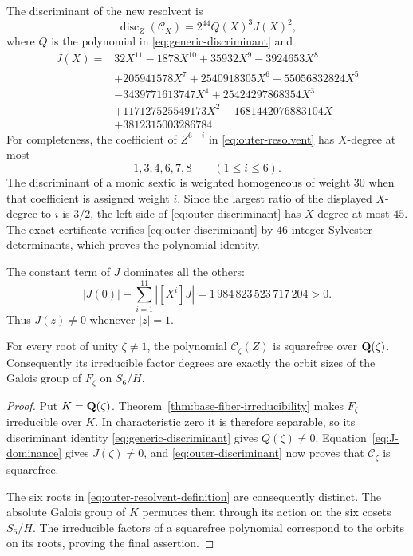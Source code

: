 The discriminant of the new resolvent is
\begin{equation}
 \operatorname{disc}_Z(\mathcal C_X)
 =2^{44}Q(X)^3J(X)^2,
 \label{eq:outer-discriminant}
\end{equation}
where $Q$ is the polynomial in \eqref{eq:generic-discriminant} and
\begin{align*}
 J(X)={}&32X^{11}-1878X^{10}+35932X^9-3924653X^8\\
 &+205941578X^7+2540918305X^6+55056832824X^5\\
 &-3439771613747X^4+25424297868354X^3\\
 &+117127525549173X^2-1681442076883104X\\
 &+3812315003286784.
\end{align*}
For completeness, the coefficient of $Z^{6-i}$ in
\eqref{eq:outer-resolvent} has $X$-degree at most
\[
 1,3,4,6,7,8\qquad(1\leq i\leq6).
\]
The discriminant of a monic sextic is weighted homogeneous of weight
$30$ when that coefficient is assigned weight $i$.  Since the largest
ratio of the displayed $X$-degree to $i$ is $3/2$, the left side of
\eqref{eq:outer-discriminant} has $X$-degree at most $45$.
The exact certificate verifies \eqref{eq:outer-discriminant} by $46$
integer Sylvester determinants, which proves the polynomial identity.

The constant term of $J$ dominates all the others:
\begin{equation}
 |J(0)|-\sum_{i=1}^{11}|[X^i]J|
 =1\,984\,823\,523\,717\,204>0.
 \label{eq:J-dominance}
\end{equation}
Thus $J(z)\ne0$ whenever $|z|=1$.

\begin{proposition}
\label{prop:outer-squarefree}
For every root of unity $\zeta\ne1$, the polynomial
$\mathcal C_\zeta(Z)$ is squarefree over $\mathbf Q(\zeta)$.
Consequently its irreducible factor degrees are exactly the orbit sizes
of the Galois group of $F_\zeta$ on $S_6/H$.
\end{proposition}

\begin{proof}
Put $K=\mathbf Q(\zeta)$.  Theorem~\ref{thm:base-fiber-irreducibility}
makes $F_\zeta$ irreducible over $K$.  In characteristic zero it is
therefore separable, so its discriminant identity
\eqref{eq:generic-discriminant} gives $Q(\zeta)\ne0$.
Equation~\eqref{eq:J-dominance} gives $J(\zeta)\ne0$, and
\eqref{eq:outer-discriminant} now proves that
$\mathcal C_\zeta$ is squarefree.

The six roots in \eqref{eq:outer-resolvent-definition} are consequently
distinct.  The absolute Galois group of $K$ permutes them through its
action on the six cosets $S_6/H$.  The irreducible factors of a
squarefree polynomial correspond to the orbits on its roots, proving
the final assertion.
\end{proof}

